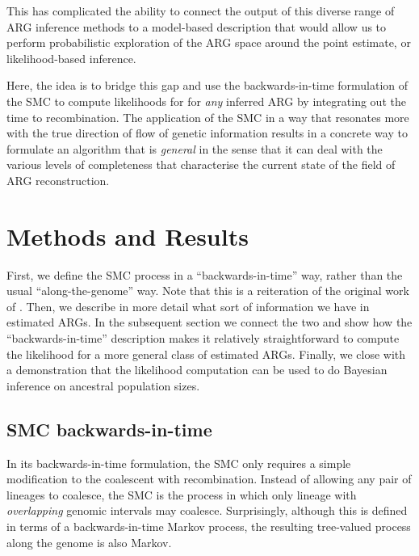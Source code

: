 \documentclass{article}
\begin{document}

This has complicated the ability to connect the output of this diverse range of
ARG inference methods to a model-based description that would allow us to perform
probabilistic exploration of the ARG space around the point estimate,
or likelihood-based inference.

Here, the idea is to bridge this gap and use the backwards-in-time formulation of the SMC
to compute likelihoods for for \textit{any} inferred ARG
by integrating out the time to recombination.
The application of the SMC in a way that resonates more
with the true direction of flow of genetic information
results in a concrete way to formulate an algorithm
that is \textit{general} in the sense that it can deal with the various levels of
completeness that characterise the current state of the field of ARG reconstruction.


\section{Methods and Results}

First, we define the SMC process in a ``backwards-in-time'' way,
rather than the usual ``along-the-genome'' way. 
Note that this is a
reiteration of the original work of \citet{mcvean_approximating_2005}.
Then, we describe
in more detail what sort of information we have in estimated ARGs.
In the subsequent section we connect the two and
show how the ``backwards-in-time'' description
makes it relatively straightforward to compute the likelihood
for a more general class of estimated ARGs.
Finally, we close with a demonstration that the likelihood computation can be used
to do Bayesian inference on ancestral population sizes.

\subsection{SMC backwards-in-time}\label{par:description}

In its backwards-in-time formulation, the SMC \citep{mcvean_approximating_2005} only requires a
simple modification to the coalescent with recombination.
Instead of allowing any pair of lineages to coalesce,
the SMC is the process in which only lineage with \emph{overlapping} genomic intervals may coalesce.
Surprisingly, although this is defined in terms of a backwards-in-time Markov process,
the resulting tree-valued process along the genome is also Markov.
\end{document}
